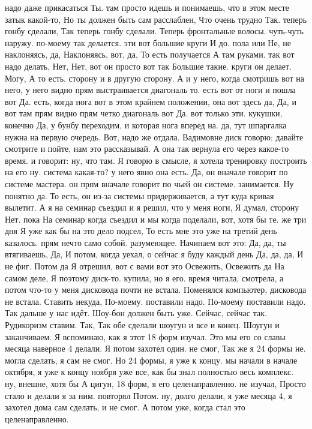 надо даже прикасаться Ты.
там просто идешь и понимаешь, что в
этом месте затык какой-то, Но ты должен быть сам расслаблен, Что очень трудно Так.
теперь гонбу сделали, Так теперь гонбу сделали. Теперь фронтальные волосы.
чуть-чуть наружу. по-моему так делается.
эти вот большие круги И до.
пола или Не, не наклоняясь, да, Наклоняясь, вот, да, То есть получается А там руками. так вот надо делать, Нет, Нет, вот он просто вот так Большие такие.
круги он делает. Могу, А то есть.
сторону и в другую сторону.
А и у него, когда смотришь вот на него, у него видно прям выстраивается диагональ то.
есть вот от ноги и пошла вот Да.
есть, когда нога вот в этом крайнем положении, она вот здесь да, Да, и вот там прям видно прям четко диагональ вот Да.
вот только эти.
кукушки, конечно Да, у бунбу переходим, и которая нога вперед на.
да, тут шпаргалка нужна на первую очередь.
Вот, надо же отдала.
Вадимовне диск говорю: давайте смотрите и пойте, нам это рассказывай. А она так вернула его через какое-то время.
и говорит: ну, что там.
Я говорю в смысле, я хотела тренировку построить на его ну.
система какая-то? у него явно она есть. Да, он вначале говорит по системе мастера. он прям вначале говорит по чьей он системе.
занимается. Ну понятно да. То есть, он из-за системы придерживается, а тут куда кривая вылетит.
А я на семинар съездил и я решил, что у меня ноги, Я думал, сторону Нет. пока На семинар когда съездил и мы когда поделали, вот,
хотя бы те.
же три дня Я уже как бы на это дело подсел, То есть мне это уже на третий день казалось.
прям нечто само собой.
разумеющее. Начинаем вот это: Да, да, ты втягиваешь, Да, И потом, когда уехал,
о сейчас я буду каждый день Да, да, да, И не фиг. Потом да Я отрешил, вот с вами вот это Освежить, Освежить да На самом деле, Я поэтому диск-то.
купила, но я его.
время читала, смотрела, а потом что-то у меня дисковода почти не встала. Поменялся компьютер, дисковода не встала.
Ставить некуда, По-моему.
поставили надо.
По-моему поставили надо.
Так дальше у нас идёт.
Шоу-бон должен быть уже.
Сейчас, сейчас так.
Рудикоризм ставим.
Так, Так обе сделали шоугун и все и конец.
Шоугун и заканчиваем.
Я вспоминаю, как я этот 18 форм изучал.
Это мы его со славы месяца наверное 4 делали.
Я потом захотел один.
не смог, Так же я 24 формы не.
могла сделать, я сам не смог.
Но 24 формы, я уже к концу. мы начали в начале октября, я уже к концу ноября уже все, как бы знал полностью весь комплекс. ну, внешне, хотя бы А цигун, 18 форм, я его целенаправленно.
не изучал, Просто стало и делали я за ним.
повторял Потом. ну, долго делали, я уже месяца 4, я захотел дома сам сделать, и не смог. А потом уже, когда стал это целенаправленно.
